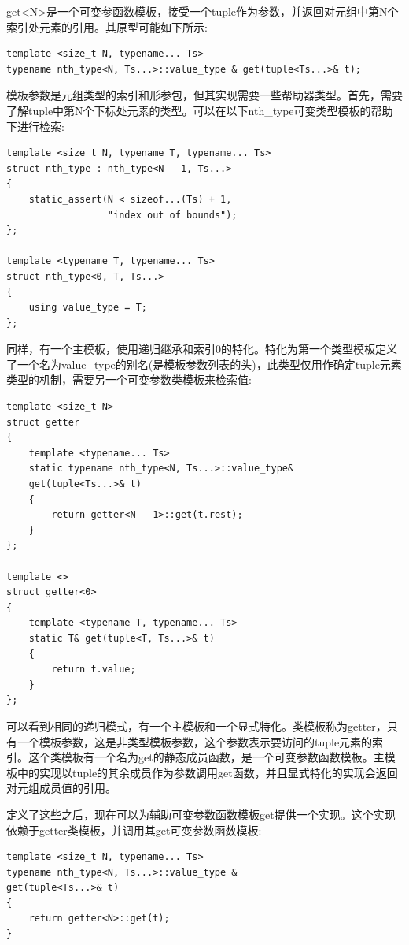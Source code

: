 get<N>是一个可变参函数模板，接受一个tuple作为参数，并返回对元组中第N个索引处元素的引用。其原型可能如下所示:

\begin{lstlisting}[style=styleCXX]
template <size_t N, typename... Ts>
typename nth_type<N, Ts...>::value_type & get(tuple<Ts...>& t);
\end{lstlisting}

模板参数是元组类型的索引和形参包，但其实现需要一些帮助器类型。首先，需要了解tuple中第N个下标处元素的类型。可以在以下nth\_type可变类型模板的帮助下进行检索:

\begin{lstlisting}[style=styleCXX]
template <size_t N, typename T, typename... Ts>
struct nth_type : nth_type<N - 1, Ts...>
{
	static_assert(N < sizeof...(Ts) + 1,
	              "index out of bounds");
};

template <typename T, typename... Ts>
struct nth_type<0, T, Ts...>
{
	using value_type = T;
};
\end{lstlisting}

同样，有一个主模板，使用递归继承和索引0的特化。特化为第一个类型模板定义了一个名为value\_type的别名(是模板参数列表的头)，此类型仅用作确定tuple元素类型的机制，需要另一个可变参数类模板来检索值:

\begin{lstlisting}[style=styleCXX]
template <size_t N>
struct getter
{
	template <typename... Ts>
	static typename nth_type<N, Ts...>::value_type&
	get(tuple<Ts...>& t)
	{
		return getter<N - 1>::get(t.rest);
	}
};

template <>
struct getter<0>
{
	template <typename T, typename... Ts>
	static T& get(tuple<T, Ts...>& t)
	{
		return t.value;
	}
};
\end{lstlisting}

可以看到相同的递归模式，有一个主模板和一个显式特化。类模板称为getter，只有一个模板参数，这是非类型模板参数，这个参数表示要访问的tuple元素的索引。这个类模板有一个名为get的静态成员函数，是一个可变参数函数模板。主模板中的实现以tuple的其余成员作为参数调用get函数，并且显式特化的实现会返回对元组成员值的引用。

定义了这些之后，现在可以为辅助可变参数函数模板get提供一个实现。这个实现依赖于getter类模板，并调用其get可变参数函数模板:

\begin{lstlisting}[style=styleCXX]
template <size_t N, typename... Ts>
typename nth_type<N, Ts...>::value_type &
get(tuple<Ts...>& t)
{
	return getter<N>::get(t);
}
\end{lstlisting}

